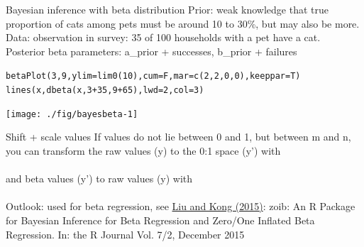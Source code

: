 \documentclass[xcolor=table,       handout,    xcolor=dvipsnames]{beamer}\usepackage[]{graphicx}\usepackage[]{color}
\makeatletter
\newcommand{\hlnum}[1]{\textcolor[rgb]{0,0,0}{#1}}
\newcommand{\hlopt}[1]{\textcolor[rgb]{0,0,0}{#1}}
\newcommand{\hlstd}[1]{\textcolor[rgb]{0,0,0}{#1}}
\newcommand{\hlkwc}[1]{\textcolor[rgb]{1,0,1}{#1}}
\newcommand{\hlkwd}[1]{\textcolor[rgb]{0,0,1}{#1}}
\newenvironment{kframe}{%
 \def\at@end@of@kframe{}%
 \ifinner\ifhmode%
  \def\at@end@of@kframe{\end{minipage}}%
  \begin{minipage}{\columnwidth}%
 \fi\fi%
 \def\FrameCommand##1{\hskip\@totalleftmargin \hskip-\fboxsep
 \colorbox{shadecolor}{##1}\hskip-\fboxsep
     \hskip-\linewidth \hskip-\@totalleftmargin \hskip\columnwidth}%
 \MakeFramed {\advance\hsize-\width
   \@totalleftmargin\z@ \linewidth\hsize
   \@setminipage}}%
 {\par\unskip\endMakeFramed%
 \at@end@of@kframe}
\newenvironment{knitrout}{}{} %
\makeatother
\begin{document}
\begin{frame}[fragile]{Bayesian inference with beta distribution}
Prior: weak knowledge that true proportion of cats among pets must be around 10 to 30\%, but may also be more.\\ \pause
Data: observation in survey: 35 of 100 households with a pet have a cat.\\ \pause
Posterior beta parameters: a\_prior + successes, b\_prior + failures \pause
\vspace{-0.8em}
\begin{knitrout}\small
{}\color{fgcolor}\begin{kframe}
\begin{alltt}
\hlkwd{betaPlot}\hlstd{(}\hlnum{3}\hlstd{,} \hlnum{9}\hlstd{,} \hlkwc{ylim}\hlstd{=}\hlkwd{lim0}\hlstd{(}\hlnum{10}\hlstd{),} \hlkwc{cum}\hlstd{=F,} \hlkwc{mar}\hlstd{=}\hlkwd{c}\hlstd{(}\hlnum{2}\hlstd{,}\hlnum{2}\hlstd{,}\hlnum{0}\hlstd{,}\hlnum{0}\hlstd{),} \hlkwc{keeppar}\hlstd{=T)}
\hlkwd{lines}\hlstd{(x,} \hlkwd{dbeta}\hlstd{(x,} \hlnum{3}\hlopt{+}\hlnum{35}\hlstd{,} \hlnum{9}\hlopt{+}\hlnum{65}\hlstd{),} \hlkwc{lwd}\hlstd{=}\hlnum{2}\hlstd{,} \hlkwc{col}\hlstd{=}\hlnum{3}\hlstd{)}
\end{alltt}
\end{kframe}

{\centering \texttt{[image: ./fig/bayesbeta-1]} 

}



\end{knitrout}
\end{frame}


\begin{frame}[fragile]{Shift + scale values}
If values do not lie between 0 and 1, but between m and n, you can transform the raw values (y) to the 0:1 space (y') with\\[1em]
~~~~~~ \\[1em]
and beta values (y') to raw values (y) with\\[1em]
~~~~~~ \\[2em]
Outlook: used for beta regression, see \href{https://journal.r-project.org/archive/2015-2/liu-kong.pdf}{Liu and Kong (2015)}: zoib: An R Package for Bayesian Inference for Beta Regression and Zero/One Inflated Beta Regression. In: the R Journal Vol. 7/2, December 2015
\end{frame}
\end{document}
